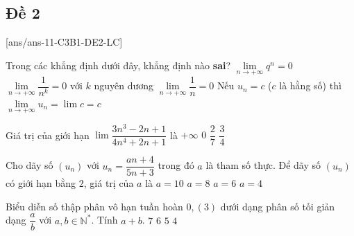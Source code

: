 \subsection{Đề 2}
[ans/ans-11-C3B1-DE2-LC]
\caulc
\begin{ex}%
	Trong các khẳng định dưới đây, khẳng định nào \textbf{sai}?
	\choice
	{\True $\lim\limits_{n \to +\infty} q^n=0$}
	{$\lim\limits_{n \to +\infty} \dfrac{1}{n^k}=0$ với $k$ nguyên dương}
	{$\lim\limits_{n \to +\infty} \dfrac{1}{n}=0$}
	{Nếu $u_n=c$ ($c$ là hằng số) thì $\lim\limits_{n \to +\infty} u_n=\lim c=c$}
\end{ex}
\begin{ex}%
	Giá trị của giới hạn $\lim \dfrac{3{n^3}-2n+1}{4{n^4}+2n+1}$ là
	\choice
		{$+\infty$}
		{\True $0$}
		{$\dfrac{2}{7}$}
		{$\dfrac{3}{4}$}
\end{ex}
\begin{ex}%
	Cho dãy số $\left({u_n} \right)$ với ${u_n}=\dfrac{an+4}{5n+3}$
	trong đó $a$ là tham số thực. Để dãy số $\left({u_n} \right)$ có giới hạn bằng $2$, giá trị của $a$ là
	\choice
		{\True $a=10$}
		{$a=8$}
		{$a=6$}
		{$a=4$}
\end{ex}
\begin{ex}%
Biểu diễn số thập phân vô hạn tuần hoàn $0,(3)$ dưới dạng phân số tối giản dạng $\dfrac{a}{b}$ với $a,b\in \mathbb{N}^*$. Tính $a+b$.
\choice
		{$7$}
		{$6$}
		{$5$}
		{\True $4$}
\end{ex}
